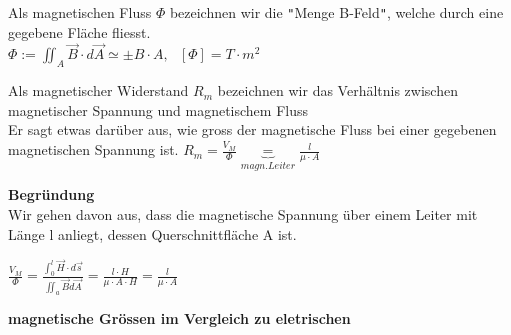 \beginip
Als magnetischen Fluss $\Phi$ bezeichnen wir die \texttt{"}Menge B-Feld\texttt{"}, welche durch eine gegebene Fläche fliesst. \\
\formulaBegin
$\displaystyle \Phi := \iint_A \vec{B}  \cdot d\vec{A} \simeq \pm B \cdot A, \ \ \ [\Phi] = T	\cdot m^2 $
\formulaEnd
\iend





\beginip
Als magnetischer Widerstand $R_m$ bezeichnen wir das Verhältnis zwischen magnetischer Spannung und magnetischem Fluss \\
Er sagt etwas darüber aus, wie gross der magnetische Fluss bei einer gegebenen magnetischen Spannung ist.
\formulaBegin
$\displaystyle R_m = \frac{V_M}{\Phi} \underbrace{=}_{magn. Leiter} \frac{l}{\mu \cdot A}$
\formulaEnd
\iend

\textbf{Begründung} \\
Wir gehen davon aus, dass die magnetische Spannung über einem Leiter mit Länge l anliegt, dessen Querschnittfläche A ist. \\
\begin{center}
	$\displaystyle \frac{V_M}{\Phi} = \frac{\int_0^l \vec{H} \cdot d\vec{s}}{\iint_a \vec{B} d \vec{A}} = \frac{l \cdot H}{\mu \cdot A \cdot H} = \frac{l}{\mu \cdot A} $

\end{center}


\newpage

\textbf{magnetische Grössen im Vergleich zu eletrischen} \\

